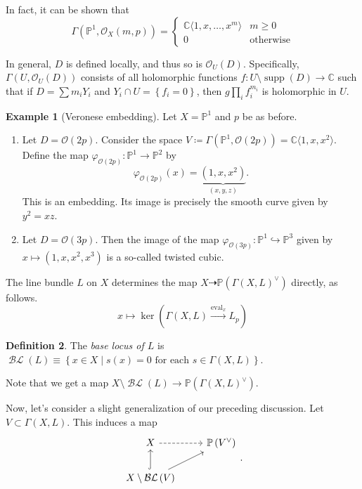 \documentclass[10pt,letterpaper,cm]{nupset}
\theoremstyle{definition}
\newtheorem{defn}{Definition}[subsection]
\newtheorem{exmp}[defn]{Example}
\theoremstyle{theorem}
\theoremstyle{remark}
\newcommand{\C}{\mathbb C}
\renewcommand{\O}{\mathcal O}
\renewcommand{\P}{\mathbb P}
\newcommand{\1}{\mathbb{1}}
\newcommand{\0}{\vec 0}
\DeclareMathOperator{\supp}{supp}
\DeclareMathOperator{\ev}{eval}
\DeclareMathOperator{\BL}{\mathcal{BL}}
\newcommand{\be}{\begin{enumerate}}
\newcommand{\ee}{\end{enumerate}}
\begin{document}
In fact, it can be shown that
\[
\Gamma\left(\P^1, \O_X\left(m,p\right)\right) = \begin{cases}
\C\langle 1, x, \ldots, x^m\rangle & m \geq 0 
\\ 0 & \text{otherwise}
\end{cases}
\]

\bigskip

In general, $D$ is defined locally, and thus so is $\O_U(D)$. Specifically,
$\Gamma\left(U, \O_U\left(D\right)\right)$ consists of all holomorphic functions $f : U \setminus \supp\left(D\right) \to \C$ such that if $D = \sum m_iY_i$ and $Y_i \cap U = \left\{f_i =0\right\}$, then $g\prod_if_i^{m_i}$ is holomorphic in $U$.

\begin{exmp}[Veronese embedding]
Let $X = \P^1$ and $p$ be as before. 
\be
\item Let $D = \O(2p)$. Consider the space $V \coloneqq \Gamma\left(\P^1, \O\left(2p\right)\right) = \C\langle 1, x, x^2\rangle.$ Define the map $\varphi_{\O(2p)} : \P^1 \to \P^2$ by $$\varphi_{\O(2p)}(x) = \underbrace{\left(1, x, x^2\right)}_{\left(x,y,z\right)}.$$ This is an embedding. Its image is precisely the smooth curve given by $y^2 = xz$.
\item Let $D = \O(3p)$. Then the image of the map $\varphi_{\O(3p)} : \P^1 \hookrightarrow \P^3$ given by $x \mapsto \left(1, x, x^2, x^3\right)$ is a so-called twisted cubic.
\ee
\end{exmp}


The line bundle $L$ on $X$ determines the map $X \dashrightarrow \P\left(\Gamma\left(X, L\right)^{\vee}\right)$ directly, as follows.
\[
x\mapsto \ker\left(\Gamma\left(X, L\right) \overset{\ev_x}{\longrightarrow} L_p\right)
\]

\begin{defn}
The \textit{base locus of $L$} is $\BL\left(L\right) \equiv \left\{x  \in X \mid s(x) =0 \text{ for each } s\in \Gamma\left(X, L\right)\right\}$.
\end{defn} 

Note that we get a map $X \setminus \BL\left(L\right) \to \P\left(\Gamma\left(X, L\right)^{\vee}\right)$.

\bigskip

Now, let's consider a slight generalization of our preceding discussion. Let $V \subset \Gamma\left(X, L\right)$. This induces a map 
\[
\begin{tikzcd}
X \arrow[r, dashed]                                    & \P\left(V^{\vee}\right) \\
X\setminus\BL\left(V\right) \arrow[u, hook] \arrow[ru] &                        
\end{tikzcd}.
\]
\end{document}
